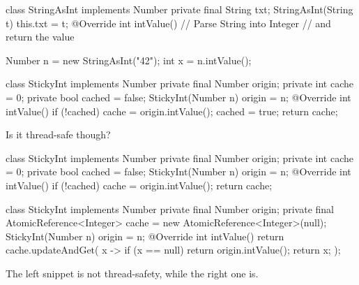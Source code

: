 \documentclass{article}
\begin{document}

\begin{pptWide}{2}
{\small\begin{ffcode}
class StringAsInt implements Number {
  private final String txt;
  StringAsInt(String t) { this.txt = t; }
  @Override int intValue() {
    // Parse String into Integer
    // and return the value
  }
}

Number n = new StringAsInt("42");
int x = n.intValue();
\end{ffcode}
}
\par\columnbreak\par
{\small\begin{ffcode}
class StickyInt implements Number {
  private final Number origin;
  private int cache = 0;
  private bool cached = false;
  StickyInt(Number n) { origin = n; }
  @Override int intValue() {
    if (!cached) {
      cache = origin.intValue();
      cached = true;
    }
    return cache; } }
\end{ffcode}
}
\end{pptWide}
\par
Is it thread-safe though?
\plush{}

\begin{pptWide}{2}
{\small\begin{ffcode}
class StickyInt implements Number {
  private final Number origin;
  private int cache = 0;
  private bool cached = false;
  StickyInt(Number n) { origin = n; }
  @Override int intValue() {
    if (!cached) {
      cache = origin.intValue();
    }
    return cache;
  }
}
\end{ffcode}
}
\par\columnbreak\par
{\scriptsize\begin{ffcode}
class StickyInt implements Number {
  private final Number origin;
  private final AtomicReference<Integer> cache =
    new AtomicReference<Integer>(null);
  StickyInt(Number n) { origin = n; }
  @Override int intValue() {
    return cache.updateAndGet(
      x -> {
        if (x == null) {
          return origin.intValue();
        }
        return x;
      }
    );
  }
}
\end{ffcode}
}
\end{pptWide}
\par
The left snippet is not thread-safety, while the right one is.
\plush{}
\end{document}
